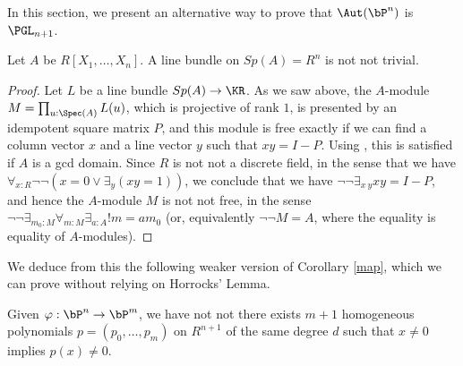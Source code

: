 In this section, we present an alternative way to prove that   $\Aut(\bP^n)$ is $\PGL_{n+1}$.

\begin{lemma}\label{notnot}
 Let $A$ be $R[X_1,\dots,X_n]$. A line bundle on $Sp(A) = R^n$ is not not trivial.
\end{lemma}

\begin{proof}
  Let $L$ be a line bundle $Sp(A)\rightarrow\KR$. As we saw above, the $A$-module $M = \prod_{u:\Spec(A)}L(u)$,
  which is projective of rank $1$,   is presented by an idempotent square matrix $P$, and this module is free
  exactly if we can find a column vector $x$ and a line vector $y$ such that $xy = I-P$. Using
  \cite{seminormal}, this is satisfied if $A$ is a gcd domain. Since $R$ is not not a discrete
  field, in the sense that we have $\forall_{x:R}\neg\neg (x=0 \vee \exists_y (xy = 1))$, we conclude
  that we have $\neg\neg \exists_{x~y}xy = I-P$, and hence the $A$-module  $M$
  is not not free, in the sense $\neg\neg \exists_{m_0:M}\forall_{m:M}\exists_{a:A}! m = am_0$
  (or, equivalently $\neg\neg M = A$, where the equality is equality of $A$-modules).
\end{proof}

We deduce from this the following weaker version of Corollary \ref{map}, which we can prove without relying
on Horrocks' Lemma.

\begin{lemma}\label{weakmap}
  Given $\varphi:\bP^n\rightarrow  \bP^m$, we have not not there exists
  $m+1$ homogeneous polynomials $p = (p_0,\dots,p_m)$ on $R^{n+1}$
  of the same   degree $d$ such that $x\neq 0$ implies $p(x)\neq 0$.
\end{lemma}

